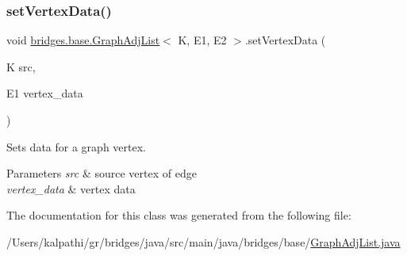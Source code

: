 \subsubsection{\texorpdfstring{setVertexData()}{setVertexData()}}
{\footnotesize\ttfamily void \mbox{\hyperlink{classbridges_1_1base_1_1_graph_adj_list}{bridges.\+base.\+Graph\+Adj\+List}}$<$ K, E1, E2 $>$.set\+Vertex\+Data (\begin{DoxyParamCaption}\item[{K}]{src,  }\item[{E1}]{vertex\+\_\+data }\end{DoxyParamCaption})}



Sets data for a graph vertex. 


\begin{DoxyParams}{Parameters}
{\em src} & source vertex of edge \\
\hline
{\em vertex\+\_\+data} & vertex data \\
\hline
\end{DoxyParams}


The documentation for this class was generated from the following file\+:\begin{DoxyCompactItemize}
\item 
/\+Users/kalpathi/gr/bridges/java/src/main/java/bridges/base/\mbox{\hyperlink{_graph_adj_list_8java}{Graph\+Adj\+List.\+java}}\end{DoxyCompactItemize}
